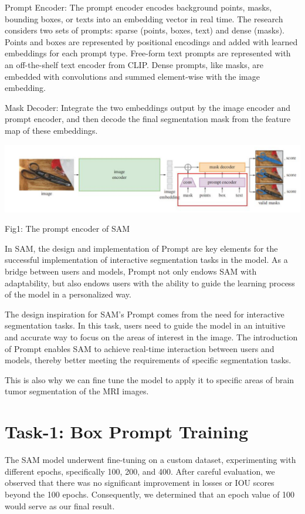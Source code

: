 \documentclass[12pt, a4paper, oneside]{article}
\begin{document}
Prompt Encoder: The prompt encoder encodes background points, masks, bounding boxes, or texts into an embedding vector in real time. The research considers two sets of prompts: sparse (points, boxes, text) and dense (masks). Points and boxes are represented by positional encodings and added with learned embeddings for each prompt type. Free-form text prompts are represented with an off-the-shelf text encoder from CLIP. Dense prompts, like masks, are embedded with convolutions and summed element-wise with the image embedding.

Mask Decoder: Integrate the two embeddings output by the image encoder and prompt encoder, and then decode the final segmentation mask from the feature map of these embeddings.
\begin{center}
\includegraphics[width=1\textwidth]{1.png}
\caption{Fig1: The prompt encoder of SAM}
\end{center}
In SAM, the design and implementation of Prompt are key elements for the successful implementation of interactive segmentation tasks in the model. As a bridge between users and models, Prompt not only endows SAM with adaptability, but also endows users with the ability to guide the learning process of the model in a personalized way.

The design inspiration for SAM's Prompt comes from the need for interactive segmentation tasks. In this task, users need to guide the model in an intuitive and accurate way to focus on the areas of interest in the image. The introduction of Prompt enables SAM to achieve real-time interaction between users and models, thereby better meeting the requirements of specific segmentation tasks.

This is also why we can fine tune the model to apply it to specific areas of brain tumor segmentation of the MRI images. 

\section{Task-1: Box Prompt Training}
The SAM model underwent fine-tuning on a custom dataset, experimenting with different epochs, specifically 100, 200, and 400. After careful evaluation, we observed that there was no significant improvement in losses or IOU scores beyond the 100 epochs. Consequently, we determined that an epoch value of 100 would serve as our final result.
\end{document}
